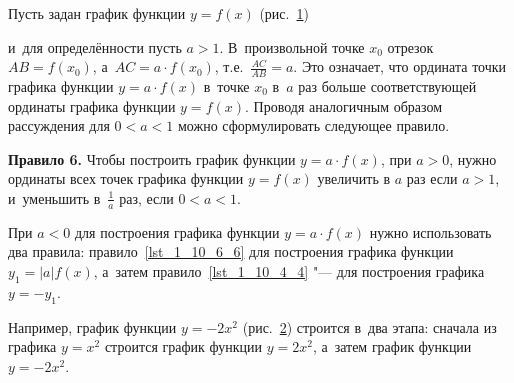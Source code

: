 
Пусть задан график функции $y  = f(x)$ (рис.\ \ref{fig_1_10_29})

\begin{figure}\label{fig_1_10_29}
\end{figure}

и~для определённости пусть $a > 1$.
В~произвольной точке $x_{0}$ отрезок $AB = f(x_{0})$,
а~$AC = a \cdot f(x_{0})$, т.е.~$\displaystyle \frac{AC}{AB} = a$.
Это означает, что ордината точки графика функции $y = a \cdot f(x)$
в~точке $x_{0}$ в~$a$ раз больше соответствующей ординаты графика
функции $y = f(x)$.
Проводя аналогичным образом рассуждения для $0 < a < 1$ можно
сформулировать следующее правило.

\textbf{Правило 6.}\label{lst_1_10_6_6} Чтобы построить график функции $y = a \cdot f(x)$,
при $a > 0$, нужно ординаты всех точек графика функции $y = f(x)$
увеличить в $a$ раз если $a > 1$, и~уменьшить в~$\displaystyle \frac{1}{a}$ раз,
если $0 < a < 1$.

\begin{figure}
\end{figure}

При $a < 0$ для построения графика функции $y = a \cdot f(x)$ нужно
использовать два правила: правило~\ref{lst_1_10_6_6} для построения
графика функции $y_{1} = |a| f(x)$,
а~затем правило~\ref{lst_1_10_4_4} "--- для построения графика $y = -y_{1}$.

Например, график функции $y = -2x^{2}$ (рис.\ \ref{fig_1_10_30}) строится в~два этапа:
сначала из графика $y = x^{2}$ строится график функции $y = 2x^{2}$,
а~затем график функции $y = -2x^{2}$.

\begin{figure}\label{fig_1_10_30}
\end{figure}

